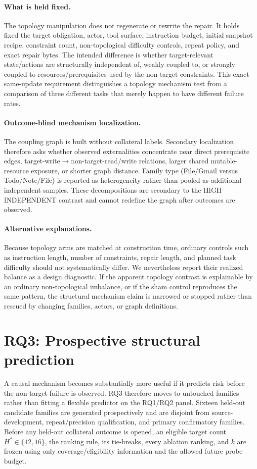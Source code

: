\documentclass{article}
\begin{document}
\paragraph{What is held fixed.}
The topology manipulation does not regenerate or rewrite the repair. It holds fixed the target obligation, actor, tool surface, instruction budget, initial snapshot recipe, constraint count, non-topological difficulty controls, repeat policy, and exact repair bytes. The intended difference is whether target-relevant state/actions are structurally independent of, weakly coupled to, or strongly coupled to resources/prerequisites used by the non-target constraints. This exact-same-update requirement distinguishes a topology mechanism test from a comparison of three different tasks that merely happen to have different failure rates.

\paragraph{Outcome-blind mechanism localization.}
The coupling graph is built without collateral labels. Secondary localization therefore asks whether observed externalities concentrate near direct prerequisite edges, target-write$\rightarrow$non-target-read/write relations, larger shared mutable-resource exposure, or shorter graph distance. Family type (File/Gmail versus Todo/Note/File) is reported as heterogeneity rather than pooled as additional independent samples. These decompositions are secondary to the HIGH--INDEPENDENT contrast and cannot redefine the graph after outcomes are observed.

\paragraph{Alternative explanations.}
Because topology arms are matched at construction time, ordinary controls such as instruction length, number of constraints, repair length, and planned task difficulty should not systematically differ. We nevertheless report their realized balance as a design diagnostic. If the apparent topology contrast is explainable by an ordinary non-topological imbalance, or if the sham control reproduces the same pattern, the structural mechanism claim is narrowed or stopped rather than rescued by changing families, actors, or graph definitions.

\section{RQ3: Prospective structural prediction}
\label{sec:rq3}
A causal mechanism becomes substantially more useful if it predicts risk before the non-target failure is observed. RQ3 therefore moves to untouched families rather than fitting a flexible predictor on the RQ1/RQ2 panel. Sixteen held-out candidate families are generated prospectively and are disjoint from source-development, repeat/precision qualification, and primary confirmatory families. Before any held-out collateral outcome is opened, an eligible target count $H^*\in\{12,16\}$, the ranking rule, its tie-breaks, every ablation ranking, and $k$ are frozen using only coverage/eligibility information and the allowed future probe budget.
\end{document}
